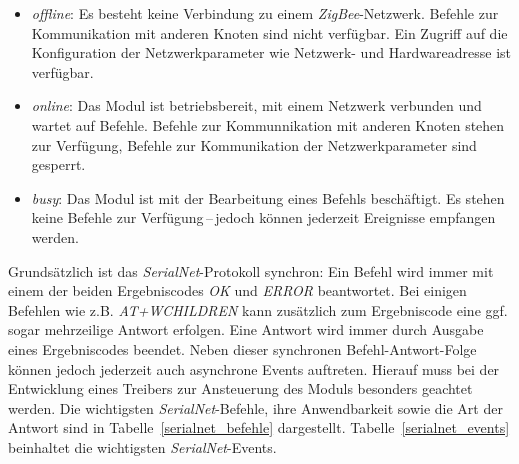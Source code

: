                 \begin{itemize}
                    \item{\emph{offline}:} Es besteht keine Verbindung zu einem \emph{ZigBee}-Netzwerk. Befehle
                                    zur Kommunikation mit anderen Knoten sind nicht verfügbar. 
                                    Ein Zugriff auf die Konfiguration der Netzwerkparameter wie 
                                    Netzwerk- und Hardwareadresse ist verfügbar. 

                    \item{\emph{online}:} Das Modul ist betriebsbereit, mit einem Netzwerk verbunden und wartet
                                   auf Befehle. Befehle zur Kommunnikation mit anderen Knoten stehen zur
                                   Verfügung, Befehle zur Kommunikation der Netzwerkparameter sind gesperrt.

                    \item{\emph{busy}:} Das Modul ist mit der Bearbeitung eines Befehls beschäftigt. Es stehen
                                 keine Befehle zur Verfügung\,--\,jedoch können jederzeit Ereignisse 
                                 empfangen werden.
                \end{itemize}
                                    
                Grundsätzlich ist das \emph{SerialNet}-Protokoll synchron: Ein Befehl wird immer mit einem der beiden 
                Ergebniscodes \emph{OK} und \emph{ERROR} beantwortet. Bei einigen Befehlen wie z.B. \emph{AT+WCHILDREN}
                kann zusätzlich zum Ergebniscode eine ggf. sogar mehrzeilige Antwort erfolgen. Eine Antwort wird immer
                durch Ausgabe eines Ergebniscodes beendet. Neben dieser synchronen Befehl-Antwort-Folge können jedoch
                jederzeit auch asynchrone Events auftreten. Hierauf muss bei der Entwicklung eines Treibers zur 
                Ansteuerung des Moduls besonders geachtet werden. Die wichtigsten \emph{SerialNet}-Befehle, ihre
                Anwendbarkeit sowie die Art der Antwort sind in Tabelle~\ref{serialnet_befehle} dargestellt.
                Tabelle~\ref{serialnet_events} beinhaltet die wichtigsten \emph{SerialNet}-Events.

